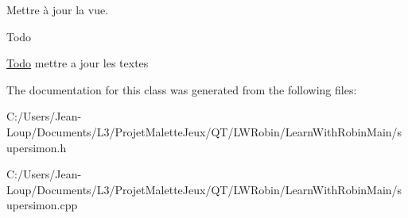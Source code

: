 Mettre à jour la vue. 

\begin{DoxyRefDesc}{Todo}
\item[\hyperlink{todo__todo000025}{Todo}]mettre a jour les textes \end{DoxyRefDesc}


The documentation for this class was generated from the following files\+:\begin{DoxyCompactItemize}
\item 
C\+:/\+Users/\+Jean-\/\+Loup/\+Documents/\+L3/\+Projet\+Malette\+Jeux/\+Q\+T/\+L\+W\+Robin/\+Learn\+With\+Robin\+Main/supersimon.\+h\item 
C\+:/\+Users/\+Jean-\/\+Loup/\+Documents/\+L3/\+Projet\+Malette\+Jeux/\+Q\+T/\+L\+W\+Robin/\+Learn\+With\+Robin\+Main/supersimon.\+cpp\end{DoxyCompactItemize}
